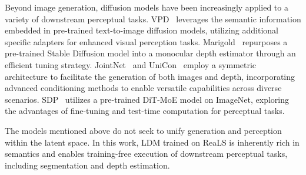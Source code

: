 Beyond image generation, diffusion models have been increasingly applied to a variety of downstream perceptual tasks. VPD~\cite{zhao2023vpd} leverages the semantic information embedded in pre-trained text-to-image diffusion models, utilizing additional specific adapters for enhanced visual perception tasks. Marigold~\cite{ke2024marigold} repurposes a pre-trained Stable Diffusion model into a monocular depth estimator through an efficient tuning strategy. JointNet~\cite{zhang2023jointnet} and UniCon~\cite{li2024unicon} employ a symmetric architecture to facilitate the generation of both images and depth, incorporating advanced conditioning methods to enable versatile capabilities across diverse scenarios. SDP~\cite{ravishankar2024sdp} utilizes a pre-trained DiT-MoE model on ImageNet, exploring the advantages of fine-tuning and test-time computation for perceptual tasks. 

The models mentioned above do not seek to unify generation and perception within the latent space. In this work, LDM trained on ReaLS is inherently rich in semantics and enables training-free execution of downstream perceptual tasks, including segmentation and depth estimation.